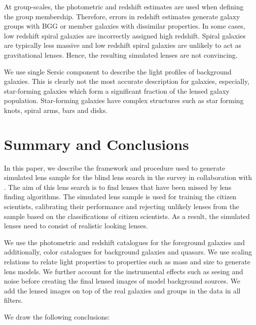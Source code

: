 \documentclass[useAMS,usenatbib,a4paper]{mn2e}
\begin{document}
At group-scales, the photometric and redshift estimates are used when
defining the group membership. Therefore, errors in redshift estimates generate
galaxy groups with BGG or member galaxies with dissimilar properties. In some
cases, low redshift spiral galaxies are incorrectly assigned high redshift.
Spiral galaxies are typically less massive and low redshift spiral galaxies are
unlikely to act as gravitational lenses. Hence, the resulting simulated lenses
are not convincing.

We use single Sersic component to describe the light profiles of background
galaxies. This is clearly not the most accurate description for galaxies,
especially, star-forming galaxies which form a significant fraction of the
lensed galaxy population. Star-forming galaxies have complex structures such as
star forming knots, spiral arms, bars and disks. 


\section{Summary and Conclusions}
\label{sec:conclude}
In this paper, we describe the framework and procedure used to generate
simulated lens sample for the blind lens search in the \cfhtls survey in
collaboration with \sw. The aim of this lens search is to find lenses that have
been missed by lens finding algorithms. The simulated lens sample is used for
training the citizen scientists, calibrating their performance and rejecting
unlikely lenses from the sample based on the classifications of citizen
scientists. As a result, the simulated lenses need to consist of realistic
looking lenses.

We use the photometric and redshift catalogues for the foreground galaxies and
additionally, color catalogues for background galaxies and quasars. We
use scaling relations to relate light properties to properties such as mass and
size to generate lens models. We further account for the
instrumental effects such as seeing and noise before creating the final lensed
images of model background sources. We add the lensed images on top of the real
galaxies and groups in the \cfhtls data in all filters.

We draw the following conclusions:
\end{document}
